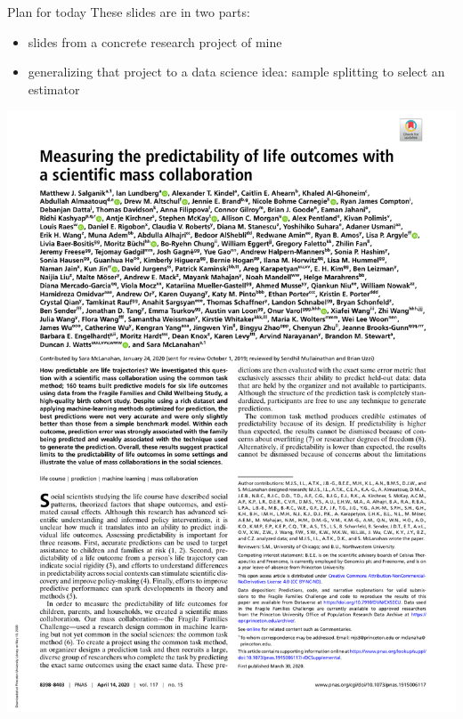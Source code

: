 \documentclass{beamer}
\title{}
\author{}
\begin{document}

\begin{frame}
\end{frame}


\begin{frame}{Plan for today}
These slides are in two parts:
\begin{itemize}
\item slides from a concrete research project of mine
\item generalizing that project to a data science idea: sample splitting to select an estimator
\end{itemize}
\end{frame}


\begin{frame}

\includegraphics[width = \textwidth, trim = {0 6.5in 0 .6in}, clip]{figures/pnas_page1}

\end{frame}
\end{document}
